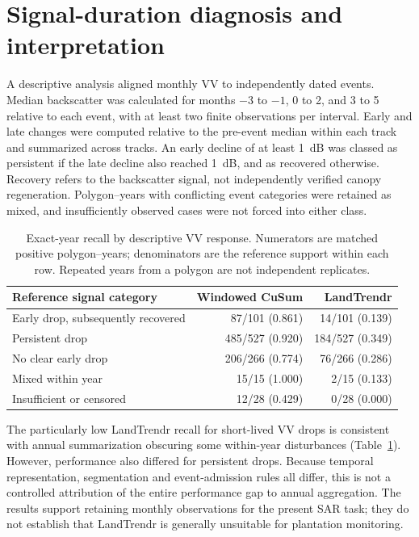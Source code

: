 \documentclass[11pt,a4paper]{article}
\begin{document}
\section{Signal-duration diagnosis and interpretation}
\label{sec:si_signal_diagnosis}
A descriptive analysis aligned monthly VV to independently dated events. Median backscatter was calculated for months $-3$ to $-1$, 0 to 2, and 3 to 5 relative to each event, with at least two finite observations per interval. Early and late changes were computed relative to the pre-event median within each track and summarized across tracks. An early decline of at least 1~dB was classed as persistent if the late decline also reached 1~dB, and as recovered otherwise. Recovery refers to the backscatter signal, not independently verified canopy regeneration. Polygon--years with conflicting event categories were retained as mixed, and insufficiently observed cases were not forced into either class.

\begin{table}[!htbp]
\caption{Exact-year recall by descriptive VV response. Numerators are matched positive polygon--years; denominators are the reference support within each row. Repeated years from a polygon are not independent replicates.}
\label{tab:si_signal_recall}
\centering\small
\setlength{\tabcolsep}{5pt}
\begin{tabular*}{\linewidth}{@{\extracolsep{\fill}}lrr@{}}
\toprule
Reference signal category & Windowed CuSum & LandTrendr\\
\midrule
Early drop, subsequently recovered & 87/101 (0.861) & 14/101 (0.139)\\
Persistent drop                   & 485/527 (0.920) & 184/527 (0.349)\\
No clear early drop               & 206/266 (0.774) & 76/266 (0.286)\\
Mixed within year                 & 15/15 (1.000) & 2/15 (0.133)\\
Insufficient or censored          & 12/28 (0.429) & 0/28 (0.000)\\
\bottomrule
\end{tabular*}
\end{table}

The particularly low LandTrendr recall for short-lived VV drops is consistent with annual summarization obscuring some within-year disturbances (Table~\ref{tab:si_signal_recall}). However, performance also differed for persistent drops. Because temporal representation, segmentation and event-admission rules all differ, this is not a controlled attribution of the entire performance gap to annual aggregation. The results support retaining monthly observations for the present SAR task; they do not establish that LandTrendr is generally unsuitable for plantation monitoring.
\end{document}
